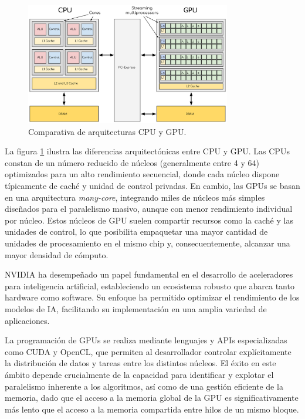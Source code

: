 \documentclass[11pt,spanish,listoffigures,listoftables]{tfgetsinf}
\begin{document}
\begin{figure}[H]
   \centering
   \includegraphics[width=0.8\textwidth]{images/estado_del_arte/cpu_vs_gpu.png}
   \caption{Comparativa de arquitecturas CPU y GPU.}
   \label{fig:cpu_vs_gpu}
\end{figure}
La figura \ref{fig:cpu_vs_gpu}\cite{enccs_gpu_ecosystem} ilustra las diferencias arquitectónicas entre CPU y GPU. Las CPUs constan de un número reducido de núcleos (generalmente entre 4 y 64) optimizados para un alto rendimiento secuencial, donde cada núcleo dispone típicamente de caché y unidad de control privadas. En cambio, las GPUs se basan en una arquitectura \textit{many-core}, integrando miles de núcleos más simples diseñados para el paralelismo masivo, aunque con menor rendimiento individual por núcleo. Estos núcleos de GPU suelen compartir recursos como la caché y las unidades de control, lo que posibilita empaquetar una mayor cantidad de unidades de procesamiento en el mismo chip y, consecuentemente, alcanzar una mayor densidad de cómputo.


NVIDIA ha desempeñado un papel fundamental en el desarrollo de aceleradores para inteligencia artificial, estableciendo un ecosistema robusto que abarca tanto hardware como software. Su enfoque ha permitido optimizar el rendimiento de los modelos de IA, facilitando su implementación en una amplia variedad de aplicaciones.

La programación de GPUs se realiza mediante lenguajes y APIs especializadas como CUDA y OpenCL, que permiten al desarrollador controlar explícitamente la distribución de datos y tareas entre los distintos núcleos. El éxito en este ámbito depende crucialmente de la capacidad para identificar y explotar el paralelismo inherente a los algoritmos, así como de una gestión eficiente de la memoria, dado que el acceso a la memoria global de la GPU es significativamente más lento que el acceso a la memoria compartida entre hilos de un mismo bloque.
\end{document}
